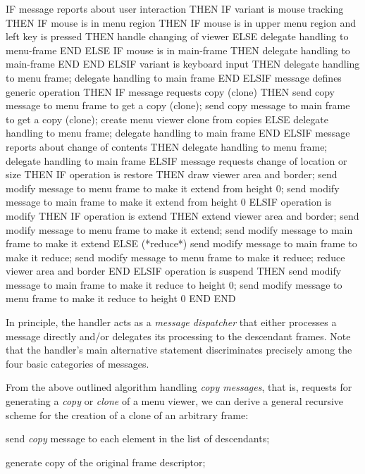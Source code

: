 IF message reports about user interaction THEN
  IF variant is mouse tracking THEN
    IF mouse is in menu region THEN
      IF mouse is in upper menu region and left key is pressed THEN
        handle changing of viewer
      ELSE delegate handling to menu-frame
      END
    ELSE
      IF mouse is in main-frame THEN delegate handling to main-frame END
    END
  ELSIF variant is keyboard input THEN
    delegate handling to menu frame;
    delegate handling to main frame
  END
ELSIF message defines generic operation THEN
  IF message requests copy (clone) THEN
    send copy message to menu frame to get a copy (clone);
    send copy message to main frame to get a copy (clone);
    create menu viewer clone from copies
  ELSE
    delegate handling to menu frame; delegate handling to main frame
  END
ELSIF message reports about change of contents THEN
  delegate handling to menu frame;
  delegate handling to main frame
ELSIF message requests change of location or size THEN
  IF operation is restore THEN
    draw viewer area and border;
    send modify message to menu frame to make it extend from height 0;
    send modify message to main frame to make it extend from height 0
  ELSIF operation is modify THEN
    IF operation is extend THEN
      extend viewer area and border;
      send modify message to menu frame to make it extend;
      send modify message to main frame to make it extend
    ELSE (*reduce*)
      send modify message to main frame to make it reduce;
      send modify message to menu frame to make it reduce;
      reduce viewer area and border
    END
  ELSIF operation is suspend THEN
    send modify message to main frame to make it reduce to height 0;
    send modify message to menu frame to make it reduce to height 0
  END
END
\endtt

\noindent In principle, the handler acts as a \emph{message dispatcher} that
either processes a message directly and/or delegates its processing to
the descendant frames. Note that the handler's main alternative
statement discriminates precisely among the four basic categories of
messages.

From the above outlined algorithm handling \emph{copy messages}, that
is, requests for generating a \emph{copy} or \emph{clone} of a menu
viewer, we can derive a general recursive scheme for the creation of a
clone of an arbitrary frame:

send \emph{copy} message to each element in the list of descendants;

generate copy of the original frame descriptor;

